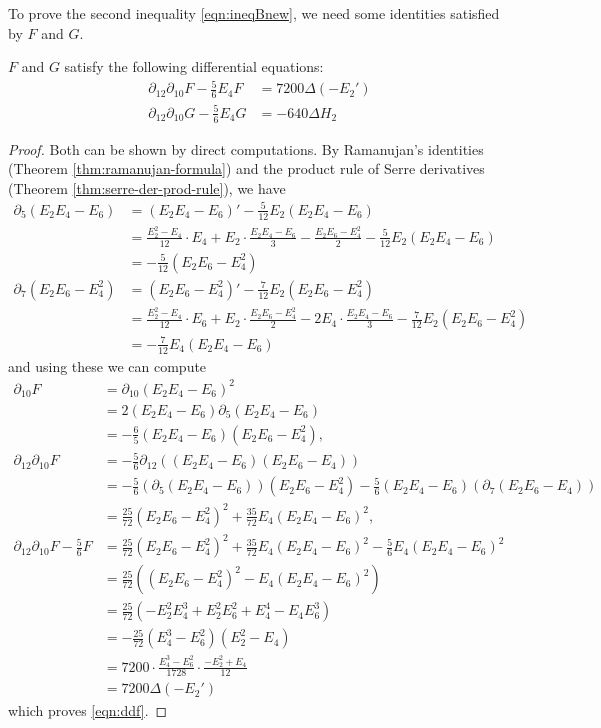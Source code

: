 To prove the second inequality \eqref{eqn:ineqBnew}, we need some identities satisfied by $F$ and $G$.
\begin{lemma}\label{lem:FGde}
$F$ and $G$ satisfy the following differential equations:
\begin{align}
    \partial_{12}\partial_{10} F - \frac{5}{6} E_{4} F &= 7200 \Delta (-E_{2}') \label{eqn:ddf} \\
    \partial_{12}\partial_{10} G - \frac{5}{6} E_{4} G &= -640 \Delta H_{2} \label{eqn:ddg}
\end{align}
\end{lemma}
\begin{proof}
Both can be shown by direct computations.
By Ramanujan's identities (Theorem \ref{thm:ramanujan-formula}) and the product rule of Serre derivatives (Theorem \ref{thm:serre-der-prod-rule}), we have
\begin{align}
  \partial_{5} (E_2 E_4 - E_6) &= (E_2 E_4 - E_6)' - \frac{5}{12} E_2 (E_2 E_4 - E_6) \\
  &= \frac{E_2^2 - E_4}{12} \cdot E_4 + E_2 \cdot \frac{E_2 E_4 - E_6}{3} - \frac{E_2 E_6 - E_4^2}{2} - \frac{5}{12}E_2 (E_2 E_4 - E_6) \\
  &= -\frac{5}{12} (E_2 E_6 - E_4^2) \label{eqn:S5} \\
  \partial_{7} (E_2 E_6 - E_4^2) &= (E_2 E_6 - E_4^2)' - \frac{7}{12} E_2 (E_2 E_6 - E_4^2) \\
  &= \frac{E_2^2 - E_4}{12} \cdot E_6 + E_2 \cdot \frac{E_2 E_6 - E_4^2}{2} - 2 E_4 \cdot \frac{E_2 E_4 - E_6}{3} - \frac{7}{12} E_2 (E_2 E_6 - E_4^2) \\
  &= -\frac{7}{12} E_4 (E_2 E_4 - E_6) \label{eqn:S7}
\end{align}
and using these we can compute
\begin{align}
  \partial_{10} F &= \partial_{10} (E_2 E_4 - E_6)^2 \\
  &= 2 (E_2 E_4 - E_6) \partial_{5} (E_2 E_4 - E_6) \\
  &= -\frac{6}{5} (E_2 E_4 - E_6) (E_2 E_6 - E_4^2), \\
  \partial_{12}\partial_{10} F &= -\frac{5}{6} \partial_{12} ((E_2 E_4 - E_6) (E_2 E_6 - E_4)) \\
  &= -\frac{5}{6} (\partial_{5}(E_2 E_4 - E_6)) (E_2 E_6 - E_4^2) - \frac{5}{6} (E_2 E_4 - E_6) (\partial_{7} (E_2 E_6 - E_4)) \\
  &= \frac{25}{72} (E_2 E_6 - E_4^2)^2 + \frac{35}{72} E_4 (E_2 E_4 - E_6)^2, \\
  \partial_{12}\partial_{10}F - \frac{5}{6} F &= \frac{25}{72}(E_2 E_6 - E_4^2)^2 + \frac{35}{72} E_4 (E_2 E_4 - E_6)^2 - \frac{5}{6} E_4 (E_2 E_4 - E_6)^2 \\
  &= \frac{25}{72} ((E_2 E_6 - E_4^2)^2 - E_4 (E_2 E_4 - E_6)^2) \\
  &= \frac{25}{72} (- E_2^2 E_4^3 + E_2^2 E_6^2 + E_4^4 - E_4 E_6^3) \\
  &= -\frac{25}{72} (E_4^3 - E_6^2) (E_2^2 - E_4) \\
  &= 7200 \cdot \frac{E_4^3 - E_6^2}{1728} \cdot \frac{-E_2^2 + E_4}{12}\\
  &= 7200 \Delta (-E_2')
\end{align}
which proves \eqref{eqn:ddf}.
\end{proof}

